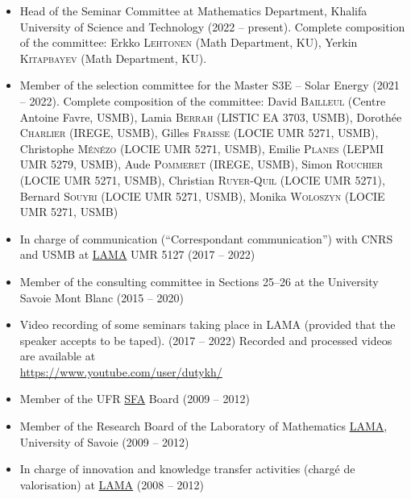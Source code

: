 \documentclass[final, a4paper, oneside, 12pt]{article}
\numberwithin{equation}{section}
\begin{document}
\begin{itemize}

  \item Head of the Seminar Committee at Mathematics Department, Khalifa University of Science and Technology (2022 -- present). Complete composition of the committee: Erkko \textsc{Lehtonen} (Math Department, KU), Yerkin \textsc{Kitapbayev} (Math Department, KU).

  \item Member of the selection committee for the Master S3E -- Solar Energy (2021 -- 2022). Complete composition of the committee: David \textsc{Bailleul} (Centre Antoine Favre, USMB), Lamia \textsc{Berrah} (LISTIC EA 3703, USMB), Doroth\'ee \textsc{Charlier} (IREGE, USMB), Gilles \textsc{Fraisse} (LOCIE UMR 5271, USMB), Christophe \textsc{M\'en\'ezo} (LOCIE UMR 5271, USMB), Emilie \textsc{Planes} (LEPMI UMR 5279, USMB), Aude \textsc{Pommeret} (IREGE, USMB), Simon \textsc{Rouchier} (LOCIE UMR 5271, USMB), Christian \textsc{Ruyer-Quil} (LOCIE UMR 5271), Bernard \textsc{Souyri} (LOCIE UMR 5271, USMB), Monika \textsc{Woloszyn} (LOCIE UMR 5271, USMB)
 
  \item In charge of communication (``Correspondant communication'') with CNRS and USMB at \href{http://www.lama.univ-savoie.fr}{LAMA} UMR 5127 (2017 -- 2022)

  \item Member of the consulting committee in Sections 25--26 at the University Savoie Mont Blanc (2015 -- 2020)
  
  \item Video recording of some seminars taking place in LAMA (provided that the speaker accepts to be taped). (2017 -- 2022) Recorded and processed videos are available at \\
  \url{https://www.youtube.com/user/dutykh/}
	
  \item Member of the UFR \href{http://www.sfa.univ-savoie.fr/}{SFA} Board (2009 -- 2012)

  \item Member of the Research Board of the Laboratory of Mathematics \href{http://www.lama.univ-savoie.fr}{LAMA}, University of Savoie (2009 -- 2012)
  
  \item In charge of innovation and knowledge transfer activities (charg\'e de valorisation) at \href{http://www.lama.univ-savoie.fr}{LAMA} (2008 -- 2012)
  

\end{itemize}
\end{document}
